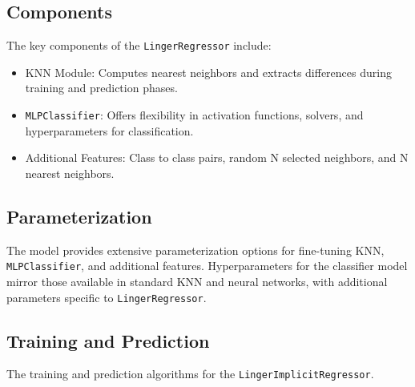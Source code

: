 \documentclass[a4paper, 12pt]{report}
\begin{document}
\subsection{Components}
The key components of the \texttt{LingerRegressor} include:
\begin{itemize}
\item KNN Module: Computes nearest neighbors and extracts differences during training and prediction phases.
\item \texttt{MLPClassifier}: Offers flexibility in activation functions, solvers, and hyperparameters for classification.
\item Additional Features: Class to class pairs, random N selected neighbors, and N nearest neighbors.
\end{itemize}

\subsection{Parameterization}
The model provides extensive parameterization options for fine-tuning KNN, \texttt{MLPClassifier}, and additional features. Hyperparameters for the classifier model mirror those available in standard KNN and neural networks, with additional parameters specific to \texttt{LingerRegressor}.

\subsection{Training and Prediction}
The training and prediction algorithms for the \texttt{LingerImplicitRegressor}.
\end{document}
